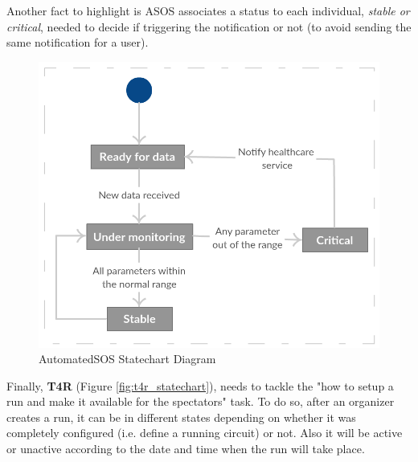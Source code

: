 \documentclass[a4paper, hidelinks, 12pt]{report}
\begin{document}
	Another fact to highlight is ASOS associates a status to each individual, \textit{stable or critical}, needed to decide if triggering the notification or not (to avoid sending the same notification for a user). \\
	
	\begin{figure}[H]
		\centering
		\includegraphics[scale=0.55]{Diagrams/asos_statechart.png}
		\caption[AutomatedSOS Statechart Diagram]{AutomatedSOS Statechart Diagram}
		\label{fig:asos_statechart}
	\end{figure}
	
	Finally, \textbf {T4R} (Figure \ref{fig:t4r_statechart}), needs to tackle the "how to setup a run and make it available for the spectators" task. To do so, after an organizer creates a run, it can be in different states depending on whether it was completely configured (i.e. define a running circuit) or not. Also it will be active or unactive according to the date and time when the run will take place.
	
\end{document}
